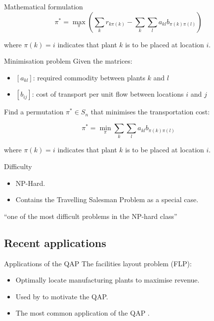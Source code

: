{{\begin{frame}{Mathematical formulation}
            \[ \pi^{*} = \max_{\pi} \left(\sum_{k}{r_{k\pi(k)}} - \sum_{k}\sum_{l}{a_{kl}b_{\pi(k)\pi(l)}}\right) \]

            where  \(\pi(k) = i\) indicates that plant \(k\) is to be placed at location \(i\).
        \end{frame}

        \begin{frame}{Minimisation problem}
            Given the matrices:
            \begin{itemize}
                \item \([a_{kl}]\): required commodity  between plants \(k\) and \(l\)
                \item \([b_{ij}]\): cost of transport per unit flow between locations \(i\) and \(j\)
            \end{itemize}

            Find a permutation \(\pi^{*} \in S_n\) that minimises the transportation cost:

            \[ \pi^{*} = \min_{\pi} \sum_{k}\sum_{l}{a_{kl}b_{\pi(k)\pi(l)}} \]

            where  \(\pi(k) = i\) indicates that plant \(k\) is to be placed at location \(i\).
        \end{frame}

        \begin{frame}{Difficulty}
            \begin{itemize}
                \item NP-Hard.
                \item Contains the Travelling Salesman Problem as a special case.
            \end{itemize}


            \vspace{0.6cm}

            \begin{center}
                ``one of the most difficult problems in the NP-hard class'' \citep{Loiola:2007jk}
            \end{center}
        \end{frame}
    }

    \subsection{Recent applications} {
        \begin{frame}{Applications of the QAP}
            The facilities layout problem (FLP):
            \begin{itemize}
                \item Optimally locate manufacturing plants to maximise revenue.
                \item Used by \citeauthor{Koopmans:1957gf} to motivate the QAP.
                \item The most common application of the QAP \citep{Loiola:2007jk}.
            \end{itemize}


\end{frame}}}

